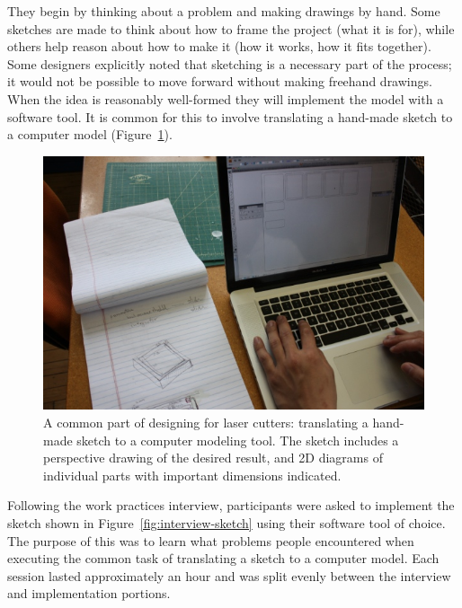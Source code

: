 \documentclass{article}
\begin{document}
They begin by thinking about a problem and making drawings by
hand. Some sketches are made to think about how to frame the project
(what it is for), while others help reason about how to make it (how
it works, how it fits together). Some designers explicitly noted that
sketching is a necessary part of the process; it would not be possible
to move forward without making freehand drawings. When the idea is
reasonably well-formed they will implement the model with a software
tool. It is common for this to involve translating a hand-made sketch
to a computer model (Figure~\ref{fig:translate}).

\begin{figure}[h]
  \centering
  \includegraphics[width=0.9\linewidth]{img/translate-sketch-to-computer.jpg}
  \caption{A common part of designing for laser cutters: translating a
    hand-made sketch to a computer modeling tool. The sketch includes
    a perspective drawing of the desired result, and 2D diagrams of
    individual parts with important dimensions indicated.}
  \label{fig:translate}
\end{figure}

Following the work practices interview, participants were asked to
implement the sketch shown in Figure~\ref{fig:interview-sketch} using
their software tool of choice. The purpose of this was to learn what
problems people encountered when executing the common task of
translating a sketch to a computer model. Each session lasted
approximately an hour and was split evenly between the interview and
implementation portions.
\end{document}
